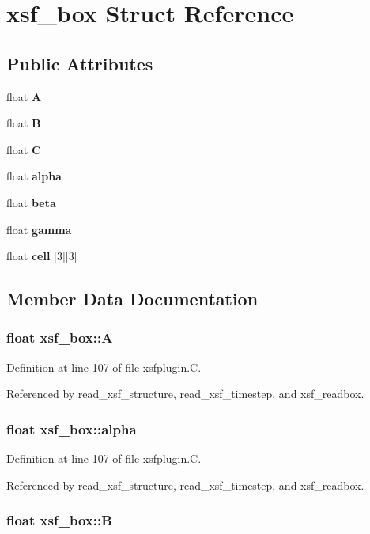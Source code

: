 \section{xsf\_\-box  Struct Reference}
\label{structxsf__box}
\subsection*{Public Attributes}
\begin{CompactItemize}
\item 
float {\bf A}
\item 
float {\bf B}
\item 
float {\bf C}
\item 
float {\bf alpha}
\item 
float {\bf beta}
\item 
float {\bf gamma}
\item 
float {\bf cell} [3][3]
\end{CompactItemize}


\subsection{Member Data Documentation}
\subsubsection{\setlength{\rightskip}{0pt plus 5cm}float xsf\_\-box::A}\label{structxsf__box_m0}




Definition at line 107 of file xsfplugin.C.

Referenced by read\_\-xsf\_\-structure, read\_\-xsf\_\-timestep, and xsf\_\-readbox.
\subsubsection{\setlength{\rightskip}{0pt plus 5cm}float xsf\_\-box::alpha}\label{structxsf__box_m3}




Definition at line 107 of file xsfplugin.C.

Referenced by read\_\-xsf\_\-structure, read\_\-xsf\_\-timestep, and xsf\_\-readbox.
\subsubsection{\setlength{\rightskip}{0pt plus 5cm}float xsf\_\-box::B}\label{structxsf__box_m1}




